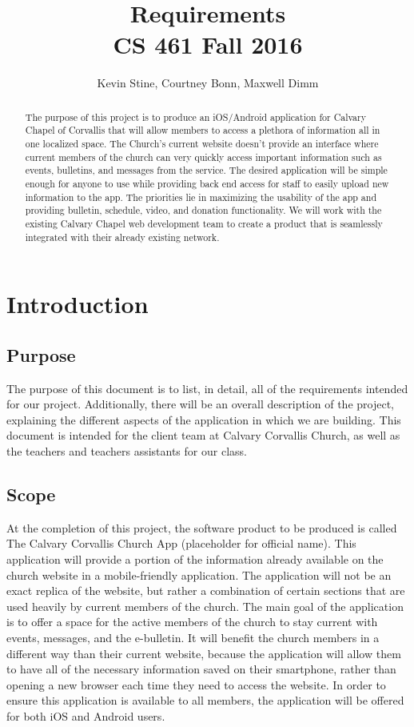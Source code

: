\documentclass[letterpaper,10pt,draftclsnofoot,onecolumn,titlepage]{IEEEtran}
\def\name{Kevin Stine, Courtney Bonn, Maxwell Dimm}
\begin{document}
	\title{\huge Requirements \\ CS 461 Fall 2016}
	\author{\large \name}

	\maketitle
		\begin{abstract}The purpose of this project is to produce an iOS/Android application for Calvary Chapel of Corvallis that will allow members to access a plethora of information all in one localized space.
		The Church's current website doesn't provide an interface where current members of the church can very quickly access important information such as events, bulletins, and messages from the service.
		The desired application will be simple enough for anyone to use while providing back end access for staff to easily upload new information to the app.
		The priorities lie in maximizing the usability of the app and providing bulletin, schedule, video, and donation functionality.
		We will work with the existing Calvary Chapel web development team to create a product that is seamlessly integrated with their already existing network.
		\end{abstract}

	\clearpage

	\section{Introduction}
	\subsection{Purpose}
	The purpose of this document is to list, in detail, all of the requirements intended for our project.
	Additionally, there will be an overall description of the project, explaining the different aspects of the application in which we are building.
	This document is intended for the client team at Calvary Corvallis Church, as well as the teachers and teachers assistants for our class.

	\subsection{Scope}
	At the completion of this project, the software product to be produced is called The Calvary Corvallis Church App (placeholder for official name).
	This application will provide a portion of the information already available on the church website in a mobile-friendly application.
	The application will not be an exact replica of the website, but rather a combination of certain sections that are used heavily by current members of the church.
	The main goal of the application is to offer a space for the active members of the church to stay current with events, messages, and the e-bulletin.
	It will benefit the church members in a different way than their current website, because the application will allow them to have all of the necessary information saved on their smartphone, rather than opening a new browser each time they need to access the website.
	In order to ensure this application is available to all members, the application will be offered for both iOS and Android users.
\end{document}
